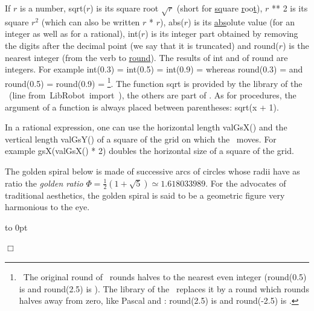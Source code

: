 If $r$ is a number, {\idt sqrt($r$)} is its square root $\sqrt{r}$ (short for
\underline{sq}uare \underline{r}oo\underline{t}),
{\idt $r$ ** 2} is its square $r^{2}$ (which can also be written {\idt $r$ * $r$}),
{\idt abs($r$)} is its \underline{abs}olute value (for an integer as well as for a rational),
{\idt int($r$)} is its integer part obtained by removing the digits after the decimal point
(we say that it is truncated) and {\idt round($r$)} is the nearest integer (from
the verb to \underline{round}). The results of {\idt int} and of {\idt round}
are integers. For example
{\idt int(0.3)} = {\idt int(0.5)} = {\idt int(0.9)} = {} whereas
{\idt round(0.3)} = {} and {\idt round(0.5)} = {\idt round(0.9)} = {}\footnote{\ The
original {\idt round} of \python\ rounds halves to the nearest even integer
({\idt round(0.5)} is {} and {\idt round(2.5)} is {}). The library of the
\robot\ replaces it by a {\idt round} which rounds halves away from zero, like
Pascal and \ocaml: {\idt round(2.5)} is {} and {\idt round(-2.5)} is {}.}.
The function {\idt sqrt} is provided by the library of the \robot\ (line
{\mcl from}\ {\idt LibRobot}\ {\mcl import}\ {\idt *}), the others are part of \python.
As for procedures, the argument of a function is always placed between
parentheses: {\idt sqrt(x + 1)}.

In a rational expression, one can use the horizontal length {\idt valGsX()} and the
vertical length {\idt valGsY()} of a square of the grid on which the \robot\ moves. For example
{\idt gsX(valGsX() * 2)} doubles the horizontal size of a square of the grid.

\begin{exemple}{\rm
The golden spiral below is made of successive arcs of circles whose radii
have as ratio the {\em golden ratio\/}
$\Phi = \frac{1}{2}(1 + \sqrt{5}) \simeq 1.618033989$. For the advocates of traditional
aesthetics, the golden spiral is said to be a geometric figure very harmonious
to the eye.

{\raggedright
 \vbox to 0pt{}
 
 }
\noindent $\Box$ }\end{exemple}

